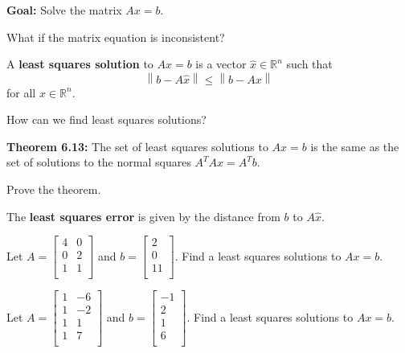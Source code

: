 \documentclass[12pt,letterpaper]{article}
\newcommand{\norm}[1]{\left\lVert#1\right\rVert}
\begin{document}
\newpage


{\bf Goal:} Solve the matrix $Ax=b$.

What if the matrix equation is inconsistent?

\begin{defn} A {\bf least squares solution} to $Ax=b$ is a vector $\hat{x} \in \mathbb{R}^n$ such that $$\norm{b-A\hat{x}} \leq \norm{b-Ax}$$ for all $x \in \mathbb{R}^n$.
\end{defn}

How can we find least squares solutions?

{\bf Theorem 6.13:} The set of least squares solutions to $Ax=b$ is the same as the set of solutions to the normal squares $A^{T}Ax=A^{T}b$.

\begin{enumerate}



\Problem Prove the theorem.

\vfill

\newpage

\begin{defn} The {\bf least squares error} is given by the distance from $b$ to $A\hat{x}$.
\end{defn}

\Problem Let $A=\begin{bmatrix} 4 & 0\\ 0 & 2\\ 1 & 1\\ \end{bmatrix}$ and $b=\begin{bmatrix} 2\\ 0\\ 11\\ \end{bmatrix}$. Find a least squares solutions to $Ax=b$.

\vfill

\Problem Let $A=\begin{bmatrix} 1 & -6\\ 1 & -2\\ 1 & 1\\1 & 7\\ \end{bmatrix}$ and $b=\begin{bmatrix} -1\\ 2\\ 1\\ 6\\ \end{bmatrix}$. Find a least squares solutions to $Ax=b$.


\end{enumerate}
\end{document}
